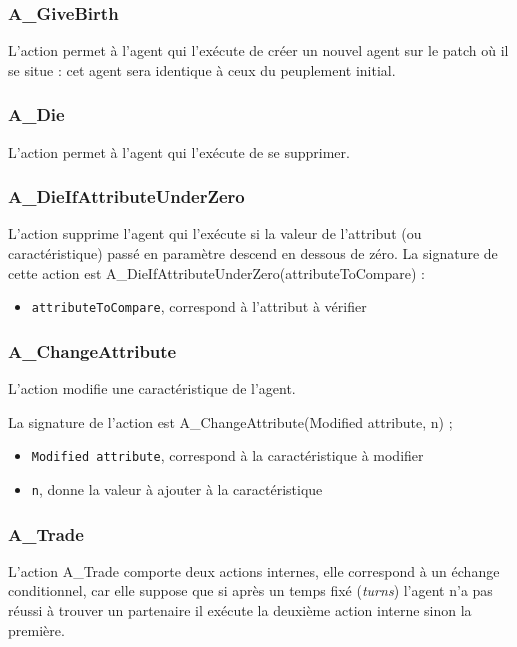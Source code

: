 	\subsubsection{A\_GiveBirth} 
	
	L'action permet à l'agent qui l'exécute de créer un nouvel agent sur le patch où il se situe : cet agent sera identique à ceux du peuplement initial.
	
	\subsubsection{A\_Die}
	
	L'action permet à l'agent qui l'exécute de se supprimer.
	
	\subsubsection{A\_DieIfAttributeUnderZero}
	
	L'action supprime l'agent qui l'exécute si la valeur de l'attribut (ou caractéristique) passé en paramètre descend en dessous de zéro. La signature de cette action est A\_DieIfAttributeUnderZero(attributeToCompare) :
	
	
	\begin{itemize}
	\item \texttt{attributeToCompare}, correspond à l'attribut à vérifier
	\end{itemize}	
	
	\subsubsection{A\_ChangeAttribute} 
	
	L'action modifie une caractéristique de l'agent. 
	
	La signature de l'action est A\_ChangeAttribute(Modified attribute, n) ;
	
	\begin{itemize}
	\item \texttt{Modified attribute}, correspond à la caractéristique à modifier
	\item \texttt{n}, donne la valeur à ajouter à la caractéristique
	\end{itemize}
	
	\subsubsection{A\_Trade} 
	
	L'action A\_Trade  comporte deux actions internes, elle correspond à un échange conditionnel,  car elle suppose que si après un temps fixé (\textit{turns}) l'agent n'a pas réussi à trouver un partenaire il exécute 
la deuxième action interne sinon la première.

